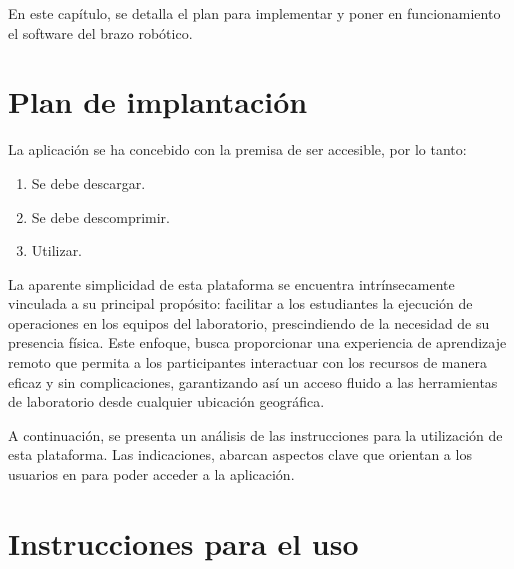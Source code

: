 En este capítulo, se detalla el plan para implementar y poner en funcionamiento el software del brazo robótico.
\section{Plan de implantación}

La aplicación se ha concebido con la premisa de ser accesible, por lo tanto:
\begin{enumerate}
    \item Se debe descargar.
    \item Se debe descomprimir.
    \item Utilizar.
\end{enumerate}

La aparente simplicidad de esta plataforma se encuentra intrínsecamente vinculada a su principal propósito: facilitar a los estudiantes la ejecución de operaciones en los equipos del laboratorio, prescindiendo de la necesidad de su presencia física. Este enfoque, busca proporcionar una experiencia de aprendizaje remoto que permita a los participantes interactuar con los recursos de manera eficaz y sin complicaciones, garantizando así un acceso fluido a las herramientas de laboratorio desde cualquier ubicación geográfica.

A continuación, se presenta un análisis de las instrucciones para la utilización de esta plataforma. Las indicaciones, abarcan aspectos clave que orientan a los usuarios en para poder acceder a la aplicación.

\clearpage
\section*{Instrucciones para el uso}

